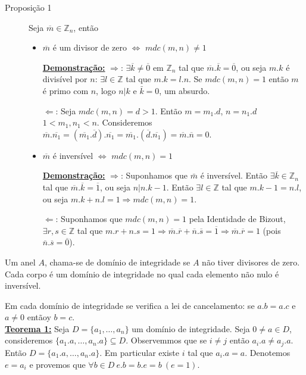 \documentclass[12pt]{book}
\newcommand{\integer}{\mathbb{Z}}
\newcommand{\mytitle}[1]{\textbf{\underline{#1}}}
\begin{document}
\begin{description}
\item[Proposição 1] Seja $\overline{m} \in \integer_n$, então
  \begin{itemize}
  \item $\overline{m}$ é um divisor de zero $\Leftrightarrow$ $mdc(m,n)\neq 1$

    \mytitle{Demonstração:} $\Rightarrow$: $\exists \overline{k}\neq \overline{0}$ em $\integer_n$ tal que $\overline{m}.\overline{k}=\overline{0}$, ou seja $m.k$ é divisível por $n$: $\exists l \in \integer$ tal que $m.k=l.n$. Se $mdc(m,n)=1$ então $m$ é primo com $n$, logo $n|k$ e $\bar{k}=0$, um absurdo.
    
    $\Leftarrow$: Seja $mdc(m,n)=d>1$. Então $m=m_1.d$, $n=n_1.d$ $1<m_1,n_1<n$. Consideremos $\overline{m}.\overline{n_1}=(\overline{m_1}.\overline{d}).\overline{n_1}=\overline{m_1}.(\overline{d}.\overline{n_1})=\overline{m}.\overline{n}=0$.
  \item $\overline{m}$ é inversível $\Leftrightarrow$ $mdc(m,n)=1$

    \mytitle{Demonstração:} $\Rightarrow$: Suponhamos que $\bar{m}$ é inversível. Então $\exists \overline{k}\in \integer_n$ tal que $\overline{m}.\overline{k}=\overline{1}$, ou seja $n|n.k-1$. Então $\exists l \in \integer$ tal que $m.k-1=n.l$, ou seja $m.k+n.l=1 \Rightarrow mdc(m,n)=1$.

    $\Leftarrow$: Suponhamos que $mdc(m,n)=1$ pela Identidade de Bizout, $\exists r,s \in \integer$ tal que $m.r+n.s=1\Rightarrow \overline{m}.\overline{r}+\overline{n}.\overline{s}=\overline{1}\Rightarrow \overline{m}.\overline{r}=1$ (pois $\overline{n}.\overline{s}=\overline{0}$).
    
  \end{itemize}
\end{description}
  Um anel $A$, chama-se de domínio de integridade se $A$ não tiver divisores de zero. Cada corpo é um domínio de integridade no qual cada elemento não nulo é inversível.

  Em cada domínio de integridade se verifica a lei de cancelamento: se $a.b=a.c$ e $a\neq 0$ entãoy $b=c$.\\
  \mytitle{Teorema 1:} Seja $D=\{a_1,\dots,a_n\}$ um domínio de integridade. Seja $0\neq a \in D$, consideremos $\{a_1.a,\dots,a_n.a\} \subseteq D$. Observemmos que se $i\neq j$ então $a_i.a\neq a_j.a$. Então $D=\{a_1.a,\dots,a_n.a\}$. Em particular existe $i$ tal que $a_i.a=a$. Denotemos $e=a_i$ e provemos que $\forall b\in D \: e.b=b.e=b \: (e=1)$.
\end{document}
